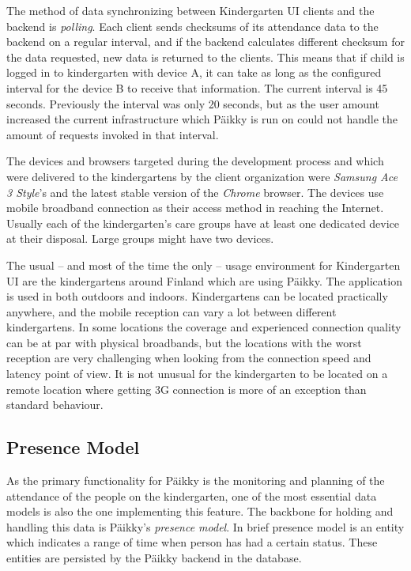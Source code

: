 The method of data synchronizing between Kindergarten UI clients and the backend is \textit{polling}. Each client sends checksums of its attendance data to the backend on a regular interval, and if the backend calculates different checksum for the data requested, new data is returned to the clients. This means that if child is logged in to kindergarten with device A, it can take as long as the configured interval for the device B to receive that information. The current interval is 45 seconds. Previously the interval was only 20 seconds, but as the user amount increased the current infrastructure which Päikky is run on could not handle the amount of requests invoked in that interval. 

The devices and browsers targeted during the development process and which  were delivered to the kindergartens by the client organization were \textit{Samsung Ace 3 Style}'s and the latest stable version of the \textit{Chrome} browser. The devices use mobile broadband connection as their access method in reaching the Internet. Usually each of the kindergarten's care groups have at least one dedicated device at their disposal. Large groups might have two devices. 

The usual -- and most of the time the only -- usage environment for Kindergarten UI are the kindergartens around Finland which are using Päikky. The application is used in both outdoors and indoors. Kindergartens can be located practically anywhere, and the mobile reception can vary a lot between different kindergartens. In some locations the coverage and experienced connection quality can be at par with physical broadbands, but the locations with the worst reception are very challenging when looking from the connection speed and latency point of view. It is not unusual for the kindergarten to be located on a remote location where getting 3G connection is more of an exception than standard behaviour. %


\subsection{Presence Model}


As the primary functionality for Päikky is the monitoring and planning of the attendance of the people on the kindergarten, one of the most essential data models is also the one implementing this feature. The backbone for holding and handling this data is Päikky's \textit{presence model}. In brief presence model is an entity which indicates a range of time when person has had a certain status. These entities are persisted by the Päikky backend in the database.


